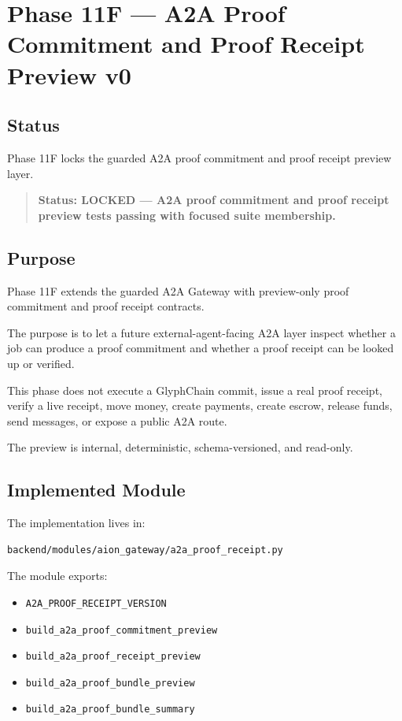 \section{Phase 11F --- A2A Proof Commitment and Proof Receipt Preview v0}
\label{sec:aion-a2a-proof-commitment-proof-receipt-preview-v0}

\subsection{Status}

Phase 11F locks the guarded A2A proof commitment and proof receipt preview layer.

\begin{quote}
\textbf{Status: LOCKED --- A2A proof commitment and proof receipt preview tests passing with focused suite membership.}
\end{quote}

\subsection{Purpose}

Phase 11F extends the guarded A2A Gateway with preview-only proof commitment and proof receipt contracts.

The purpose is to let a future external-agent-facing A2A layer inspect whether a job can produce a proof commitment and whether a proof receipt can be looked up or verified.

This phase does not execute a GlyphChain commit, issue a real proof receipt, verify a live receipt, move money, create payments, create escrow, release funds, send messages, or expose a public A2A route.

The preview is internal, deterministic, schema-versioned, and read-only.

\subsection{Implemented Module}

The implementation lives in:

\begin{verbatim}
backend/modules/aion_gateway/a2a_proof_receipt.py
\end{verbatim}

The module exports:

\begin{itemize}
  \item \texttt{A2A\_PROOF\_RECEIPT\_VERSION}
  \item \texttt{build\_a2a\_proof\_commitment\_preview}
  \item \texttt{build\_a2a\_proof\_receipt\_preview}
  \item \texttt{build\_a2a\_proof\_bundle\_preview}
  \item \texttt{build\_a2a\_proof\_bundle\_summary}
\end{itemize}

